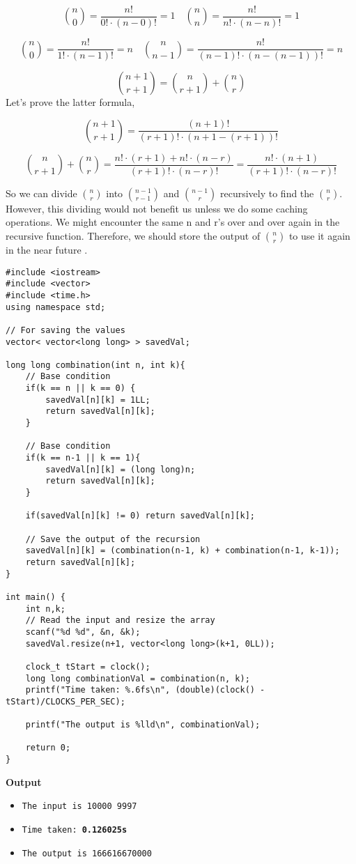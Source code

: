 \documentclass[12pt]{article}
\begin{document}
\[\binom n0 = \frac{n!}{0! \cdot (n-0)!} = 1 \quad \binom nn = \frac{n!}{n! \cdot (n-n)!} = 1\]

\[\binom n0 = \frac{n!}{1! \cdot (n-1)!} = n \quad \binom n{n-1} = \frac{n!}{(n-1)! \cdot (n-(n-1))!} = n\]

\[\binom {n+1}{r+1} = \binom {n}{r+1} + \binom {n}{r}\]
Let's prove the latter formula,

\[ \binom {n+1}{r+1} = \frac{(n+1)!}{(r+1)! \cdot (n+1-(r+1))!}\]

\[  \binom {n}{r+1} + \binom {n}{r} = \frac{n!\cdot(r+1) + n!\cdot(n-r)}{(r+1)! \cdot (n-r)!} = \frac{n!\cdot(n+1)}{(r+1)! \cdot (n-r)!}\]

So we can divide  $\binom{n}{r}$ into $\binom{n-1}{r-1}$ and $\binom{n-1}{r}$ recursively to find the $\binom{n}{r}$. However, this dividing would not benefit us unless we do some caching operations. We might encounter the same n and r's  over and over again in the recursive function. Therefore, we should store the output of $\binom{n}{r}$ to use it again in the near future \cite{combinationfind}.
\clearpage

\begin{verbatim}
#include <iostream>
#include <vector>
#include <time.h>
using namespace std;

// For saving the values
vector< vector<long long> > savedVal;

long long combination(int n, int k){
    // Base condition
    if(k == n || k == 0) {
        savedVal[n][k] = 1LL;
        return savedVal[n][k];
    }
    
    // Base condition
    if(k == n-1 || k == 1){
        savedVal[n][k] = (long long)n;
        return savedVal[n][k];
    }
    
    if(savedVal[n][k] != 0) return savedVal[n][k];
    
    // Save the output of the recursion
    savedVal[n][k] = (combination(n-1, k) + combination(n-1, k-1));
    return savedVal[n][k];
}

int main() {
    int n,k;
    // Read the input and resize the array
    scanf("%d %d", &n, &k);
    savedVal.resize(n+1, vector<long long>(k+1, 0LL));
    
    clock_t tStart = clock();
    long long combinationVal = combination(n, k);
    printf("Time taken: %.6fs\n", (double)(clock() - tStart)/CLOCKS_PER_SEC);
    
    printf("The output is %lld\n", combinationVal);
    
    return 0;
}

\end{verbatim}
\textbf{Output}
\begin{itemize}
  \item \texttt{The input is 10000 9997} 
  \item \texttt{Time taken: \textbf{0.126025s}} 
  \item \texttt{The output is 166616670000}
\end{itemize}
\end{document}
